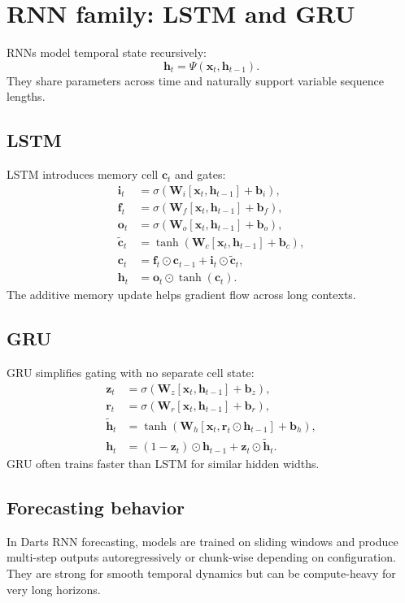 \documentclass[11pt]{article}
\begin{document}
\section{RNN family: LSTM and GRU}
RNNs model temporal state recursively:
\[
\mathbf{h}_t=\Psi(\mathbf{x}_t,\mathbf{h}_{t-1}).
\]
They share parameters across time and naturally support variable sequence lengths.

\subsection{LSTM}
LSTM introduces memory cell $\mathbf{c}_t$ and gates:
\begin{align*}
\mathbf{i}_t &= \sigma(\mathbf{W}_i[\mathbf{x}_t,\mathbf{h}_{t-1}] + \mathbf{b}_i),\\
\mathbf{f}_t &= \sigma(\mathbf{W}_f[\mathbf{x}_t,\mathbf{h}_{t-1}] + \mathbf{b}_f),\\
\mathbf{o}_t &= \sigma(\mathbf{W}_o[\mathbf{x}_t,\mathbf{h}_{t-1}] + \mathbf{b}_o),\\
\tilde{\mathbf{c}}_t &= \tanh(\mathbf{W}_c[\mathbf{x}_t,\mathbf{h}_{t-1}] + \mathbf{b}_c),\\
\mathbf{c}_t &= \mathbf{f}_t\odot\mathbf{c}_{t-1} + \mathbf{i}_t\odot\tilde{\mathbf{c}}_t,\\
\mathbf{h}_t &= \mathbf{o}_t\odot\tanh(\mathbf{c}_t).
\end{align*}
The additive memory update helps gradient flow across long contexts.

\subsection{GRU}
GRU simplifies gating with no separate cell state:
\begin{align*}
\mathbf{z}_t &= \sigma(\mathbf{W}_z[\mathbf{x}_t,\mathbf{h}_{t-1}] + \mathbf{b}_z),\\
\mathbf{r}_t &= \sigma(\mathbf{W}_r[\mathbf{x}_t,\mathbf{h}_{t-1}] + \mathbf{b}_r),\\
\tilde{\mathbf{h}}_t &= \tanh(\mathbf{W}_h[\mathbf{x}_t,\mathbf{r}_t\odot\mathbf{h}_{t-1}] + \mathbf{b}_h),\\
\mathbf{h}_t &= (1-\mathbf{z}_t)\odot\mathbf{h}_{t-1}+\mathbf{z}_t\odot\tilde{\mathbf{h}}_t.
\end{align*}
GRU often trains faster than LSTM for similar hidden widths.

\subsection{Forecasting behavior}
In Darts RNN forecasting, models are trained on sliding windows and produce multi-step outputs autoregressively or chunk-wise depending on configuration. They are strong for smooth temporal dynamics but can be compute-heavy for very long horizons.
\end{document}
